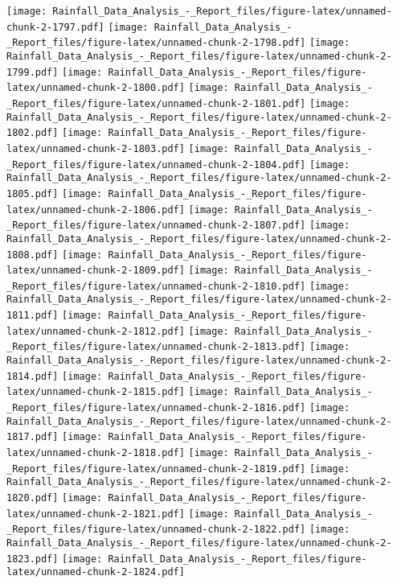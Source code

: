 \documentclass[
]{article}
\begin{document}
\texttt{[image: Rainfall\_Data\_Analysis\_-\_Report\_files/figure-latex/unnamed-chunk-2-1797.pdf]}
\texttt{[image: Rainfall\_Data\_Analysis\_-\_Report\_files/figure-latex/unnamed-chunk-2-1798.pdf]}
\texttt{[image: Rainfall\_Data\_Analysis\_-\_Report\_files/figure-latex/unnamed-chunk-2-1799.pdf]}
\texttt{[image: Rainfall\_Data\_Analysis\_-\_Report\_files/figure-latex/unnamed-chunk-2-1800.pdf]}
\texttt{[image: Rainfall\_Data\_Analysis\_-\_Report\_files/figure-latex/unnamed-chunk-2-1801.pdf]}
\texttt{[image: Rainfall\_Data\_Analysis\_-\_Report\_files/figure-latex/unnamed-chunk-2-1802.pdf]}
\texttt{[image: Rainfall\_Data\_Analysis\_-\_Report\_files/figure-latex/unnamed-chunk-2-1803.pdf]}
\texttt{[image: Rainfall\_Data\_Analysis\_-\_Report\_files/figure-latex/unnamed-chunk-2-1804.pdf]}
\texttt{[image: Rainfall\_Data\_Analysis\_-\_Report\_files/figure-latex/unnamed-chunk-2-1805.pdf]}
\texttt{[image: Rainfall\_Data\_Analysis\_-\_Report\_files/figure-latex/unnamed-chunk-2-1806.pdf]}
\texttt{[image: Rainfall\_Data\_Analysis\_-\_Report\_files/figure-latex/unnamed-chunk-2-1807.pdf]}
\texttt{[image: Rainfall\_Data\_Analysis\_-\_Report\_files/figure-latex/unnamed-chunk-2-1808.pdf]}
\texttt{[image: Rainfall\_Data\_Analysis\_-\_Report\_files/figure-latex/unnamed-chunk-2-1809.pdf]}
\texttt{[image: Rainfall\_Data\_Analysis\_-\_Report\_files/figure-latex/unnamed-chunk-2-1810.pdf]}
\texttt{[image: Rainfall\_Data\_Analysis\_-\_Report\_files/figure-latex/unnamed-chunk-2-1811.pdf]}
\texttt{[image: Rainfall\_Data\_Analysis\_-\_Report\_files/figure-latex/unnamed-chunk-2-1812.pdf]}
\texttt{[image: Rainfall\_Data\_Analysis\_-\_Report\_files/figure-latex/unnamed-chunk-2-1813.pdf]}
\texttt{[image: Rainfall\_Data\_Analysis\_-\_Report\_files/figure-latex/unnamed-chunk-2-1814.pdf]}
\texttt{[image: Rainfall\_Data\_Analysis\_-\_Report\_files/figure-latex/unnamed-chunk-2-1815.pdf]}
\texttt{[image: Rainfall\_Data\_Analysis\_-\_Report\_files/figure-latex/unnamed-chunk-2-1816.pdf]}
\texttt{[image: Rainfall\_Data\_Analysis\_-\_Report\_files/figure-latex/unnamed-chunk-2-1817.pdf]}
\texttt{[image: Rainfall\_Data\_Analysis\_-\_Report\_files/figure-latex/unnamed-chunk-2-1818.pdf]}
\texttt{[image: Rainfall\_Data\_Analysis\_-\_Report\_files/figure-latex/unnamed-chunk-2-1819.pdf]}
\texttt{[image: Rainfall\_Data\_Analysis\_-\_Report\_files/figure-latex/unnamed-chunk-2-1820.pdf]}
\texttt{[image: Rainfall\_Data\_Analysis\_-\_Report\_files/figure-latex/unnamed-chunk-2-1821.pdf]}
\texttt{[image: Rainfall\_Data\_Analysis\_-\_Report\_files/figure-latex/unnamed-chunk-2-1822.pdf]}
\texttt{[image: Rainfall\_Data\_Analysis\_-\_Report\_files/figure-latex/unnamed-chunk-2-1823.pdf]}
\texttt{[image: Rainfall\_Data\_Analysis\_-\_Report\_files/figure-latex/unnamed-chunk-2-1824.pdf]}
\end{document}
